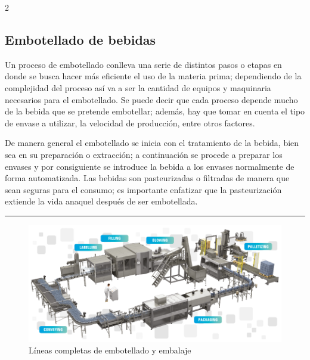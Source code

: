 \documentclass[11pt,spanish,Letterpaper,openany]{book}
\begin{document}
\begin {multicols}{2}
\medskip

\hypertarget{embotellado-de-bebidas}{%
\subsection{Embotellado de bebidas}\label{embotellado-de-bebidas}}

Un proceso de embotellado conlleva una serie de distintos pasos o etapas en donde se busca hacer más eficiente el uso de la materia prima; dependiendo de la complejidad del proceso así va a ser la cantidad de equipos y maquinaria necesarios para el embotellado. Se puede decir que cada proceso depende mucho de la bebida que se pretende embotellar; además, hay que tomar en cuenta el tipo de envase a utilizar, la velocidad de producción, entre otros factores.

\medskip

De manera general el embotellado se inicia con el tratamiento de la bebida, bien sea en su preparación o extracción; a continuación se procede a preparar los envases y por consiguiente se introduce la bebida a los envases normalmente de forma automatizada. Las bebidas son pasteurizadas o filtradas de manera que sean seguras para el consumo; es importante enfatizar que la pasteurización extiende la vida anaquel después de ser embotellada.

\end {multicols}

\begin{center}\rule{0.5\linewidth}{\linethickness}\end{center}

\begin{figure}[H]

{\centering \includegraphics[width=1\linewidth]{images/201901-lcalmo-imagen02} 

}

\caption{Líneas completas de embotellado y embalaje}\label{fig:unnamed-chunk-28}
\end{figure}
\end{document}
